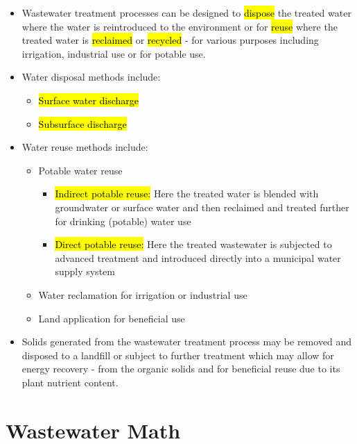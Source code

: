 \begin{itemize}
\item Wastewater treatment processes can be designed to \hl{dispose} the treated water where the water is reintroduced to the environment or for \hl{reuse} where the treated water is \hl{reclaimed} or \hl{recycled} - for various purposes including irrigation, industrial use or for potable use.
\item Water disposal methods include:\\
\begin{itemize}
\item \hl{Surface water discharge}
\item \hl{Subsurface discharge}
\end{itemize}
\item Water reuse methods include:\\
\begin{itemize}
\item Potable water reuse
\begin{itemize}
\item \hl{Indirect potable reuse:}  Here the treated water is blended with groundwater or surface water and then reclaimed and treated further 
for drinking (potable) water use
\item \hl{Direct potable reuse:}  Here the treated wastewater is subjected to advanced treatment and introduced directly into a municipal water supply system
\end{itemize}
\item Water reclamation for irrigation or industrial use\\
\item Land application for beneficial use\\
\end{itemize}
\item Solids generated from the wastewater treatment process may be removed and disposed to a landfill or subject to further treatment which may allow for energy recovery - from the organic solids and for beneficial reuse due to its plant nutrient content.\\
\end{itemize}


\chapter{Wastewater Math}


